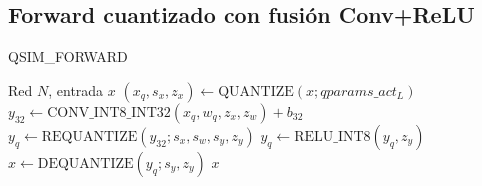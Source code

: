 \subsection*{Forward cuantizado con fusión Conv+ReLU}
\begin{algorithm}[H]
\caption{QSIM\_FORWARD}
\begin{algorithmic}[1]
\Require Red $N$, entrada $x$
    \State $(x_q,s_x,z_x) \gets \text{QUANTIZE}(x; qparams\_act_L)$
    \State $y_{32} \gets \text{CONV\_INT8\_INT32}(x_q, w_q, z_x, z_w) + b_{32}$
    \State $y_q \gets \text{REQUANTIZE}(y_{32}; s_x, s_w, s_y, z_y)$
     $y_q \gets \text{RELU\_INT8}(y_q, z_y)$ \EndIf
    \State $x \gets \text{DEQUANTIZE}(y_q; s_y, z_y)$
\EndFor
\State \Return $x$
\end{algorithmic}
\end{algorithm}
